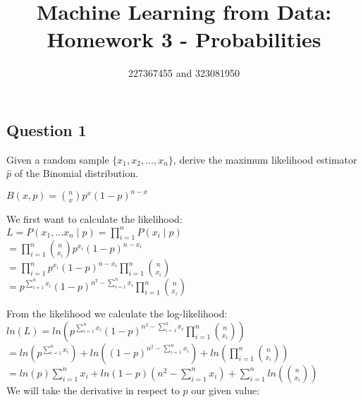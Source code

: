 \documentclass[12pt]{article}
\title{Machine Learning from Data: Homework 3 - Probabilities}
\author{227367455 and 323081950}
\begin{document}
\maketitle

\begin{center}
\section*{Question 1}

\end{center}
Given a random sample $\lbrace x_1 , x_2 , ... , x_n \rbrace$, derive the
 maximum likelihood estimator $\hat{p}$ of the Binomial distribution. \\

\begin{center}
$ B(x,p) = \binom{n}{x} p^x (1-p)^{n-x}$ 
\end{center} 

We first want to calculate the likelihood: \\

$ L = P(x_1,...x_n \mid p) =  \prod^{n}_{i = 1} P(x_i \mid p) $ \\

$ =  \prod^{n}_{i = 1} \binom{n}{x_i} p^{x_i} (1-p)^{n-x_i} $ \\

$ = \prod^{n}_{i = 1} p^{x_i} (1-p)^{n-x_i}  \prod^{n}_{i = 1} \binom{n}{x_i}  $ \\

$ = p^{\sum^{n}_{i = 1} x_i} (1-p)^{n^2 - \sum^{n}_{i = 1} x_i}  \prod^{n}_{i = 1} \binom{n}{x_i} $ \\

\newpage

From the likelihood we calculate the log-likelihood: \\

$ ln(L) = ln(p^{\sum^{n}_{i = 1} x_i} (1-p)^{n^2 - \sum^{n}_{i = 1} x_i}  \prod^{n}_{i = 1} \binom{n}{x_i}) $ \\

$ =  ln(p^{\sum^{n}_{i = 1} x_i}) + ln( (1-p)^{n^2 - \sum^{n}_{i = 1} x_i}) + ln(\prod^{n}_{i = 1} \binom{n}{x_i})  $ \\

$ = ln(p) \sum^{n}_{i = 1} x_i + ln( 1-p) (n^2 - \sum^{n}_{i = 1} x_i) +  \sum^{n}_{i = 1} ln(\binom{n}{x_i})$ \\

We will take the derivative in respect to $p$ our given value: \\
\end{document}
